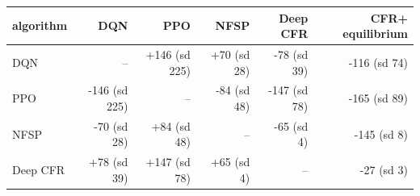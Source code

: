 \begin{tabular}{lrrrrr}
\toprule
algorithm & DQN & PPO & NFSP & Deep CFR & CFR+ equilibrium \\
\midrule
DQN & -- & +146 (sd 225) & +70 (sd 28) & -78 (sd 39) & -116 (sd 74) \\
PPO & -146 (sd 225) & -- & -84 (sd 48) & -147 (sd 78) & -165 (sd 89) \\
NFSP & -70 (sd 28) & +84 (sd 48) & -- & -65 (sd 4) & -145 (sd 8) \\
Deep CFR & +78 (sd 39) & +147 (sd 78) & +65 (sd 4) & -- & -27 (sd 3) \\
\bottomrule
\end{tabular}
